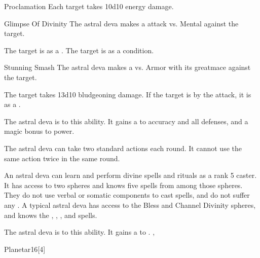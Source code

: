 {{\begin{freeability}{Proclamation}
    \hit Each target takes 10d10 energy damage.
    \end{freeability}
  

    \begin{freeability}{Glimpse Of Divinity}
       The astral deva makes a  attack
        vs. Mental against the target.
    
    \hit The target is  as a .
    \crit The target is  as a condition.
    \end{freeability}
  

    \begin{freeability}{Stunning Smash}
       The astral deva makes a 
         vs. Armor
        with its greatmace against the target.
    
    \hit The target takes 13d10 bludgeoning damage. If the target is  by the attack, it is  as a .
    \end{freeability}
  
      
              The astral deva is  to this ability.
              It gains a   to accuracy and all defenses, and a  magic bonus to power.
            
              The astral deva can take two standard actions each round.
              It cannot use the same action twice in the same round.
            
              An astral deva can learn and perform divine spells and rituals as a rank 5 caster.
              It has access to two spheres and knows five spells from among those spheres.
              They do not use verbal or somatic components to cast spells, and do not suffer any .
              A typical astral deva has access to the Bless and Channel Divinity spheres, and knows the , , ,  and  spells.
            
              The astral deva is  to this ability.
              It gains a   to .
  ,
  \begin{monsubsection}{Planetar}{16}[4]
    \vspace{-1em}\vspace{-1em}
    \vspace{0em}


\end{monsubsection}}}
